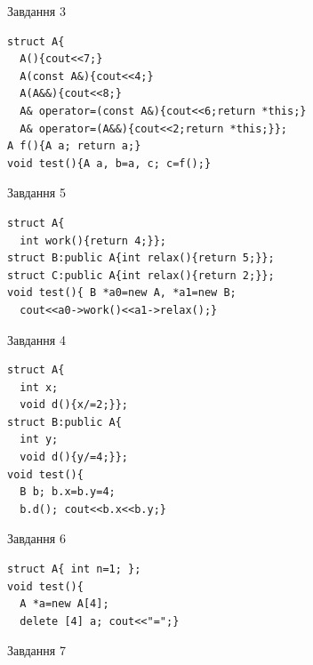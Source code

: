 \documentclass[12pt, ukrainian]{article}
\begin{document}
{{{{{\begin{minipage}[t]{11cm}
               
{\begin{center}Завдання {3}\end{center}}
\vspace{-6mm}

\begin{verbatim}
struct A{
  A(){cout<<7;}
  A(const A&){cout<<4;}
  A(A&&){cout<<8;}
  A& operator=(const A&){cout<<6;return *this;}
  A& operator=(A&&){cout<<2;return *this;}};
A f(){A a; return a;}
void test(){A a, b=a, c; c=f();}
\end{verbatim}            


               
{\begin{center}Завдання {5}\end{center}}
\vspace{-6mm}

\begin{verbatim}
struct A{
  int work(){return 4;}}; 
struct B:public A{int relax(){return 5;}};
struct C:public A{int relax(){return 2;}};
void test(){ B *a0=new A, *a1=new B;
  cout<<a0->work()<<a1->relax();}
\end{verbatim}            


\end{minipage}
\vline \hspace{8mm}
\begin{minipage}[t]{7cm}
               
{\begin{center}Завдання {4}\end{center}}
\vspace{-6mm}

\begin{verbatim}
struct A{
  int x;
  void d(){x/=2;}};
struct B:public A{
  int y;
  void d(){y/=4;}};
void test(){
  B b; b.x=b.y=4;
  b.d(); cout<<b.x<<b.y;}
\end{verbatim}            


               
{\begin{center}Завдання {6}\end{center}}
\vspace{-6mm}

\begin{verbatim}
struct A{ int n=1; };
void test(){
  A *a=new A[4]; 
  delete [4] a; cout<<"=";}
\end{verbatim}            


               
{\begin{center}Завдання {7}\end{center}}
\vspace{-6mm}


\end{minipage}}}}}}
\end{document}
